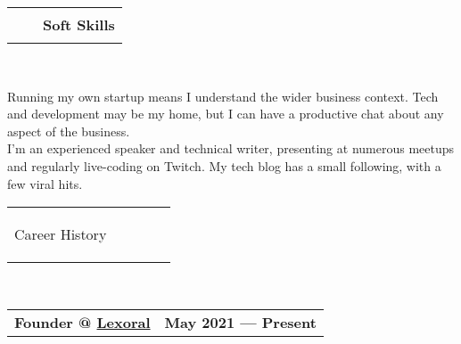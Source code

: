 \documentclass[hidelinks, 12pt, a4paper]{article}
\begin{document}
	\begin{tabularx}{\textwidth}{@{}Xrr@{}}&
		\rule{50pt}{1pt}&
		\textbf{Soft Skills}
	\end{tabularx}\\

	\begin{multicols}{2}
		Running my own startup means I understand the wider business context.
		Tech and development may be my home, but I can have a productive chat about any aspect of the business.\\
		
		I'm an experienced speaker and technical writer, presenting at numerous meetups and regularly live-coding on Twitch. My tech blog has a small following, with a few viral hits.\\
	\end{multicols}
	
	\newpage
	
	\begin{tabularx}{\textwidth}{@{}llXrr@{}}
		\begin{Large}Career History\end{Large}&
		\rule{80pt}{1pt}&&&
	\end{tabularx}\\
	
	\begin{tabularx}{\linewidth}{@{}Xr@{}}
		\textbf{Founder @ \href{https://www.lexoral.com/}{Lexoral}} & \textbf{May 2021 --- Present}
	\end{tabularx}\vspace{2pt}
\end{document}
